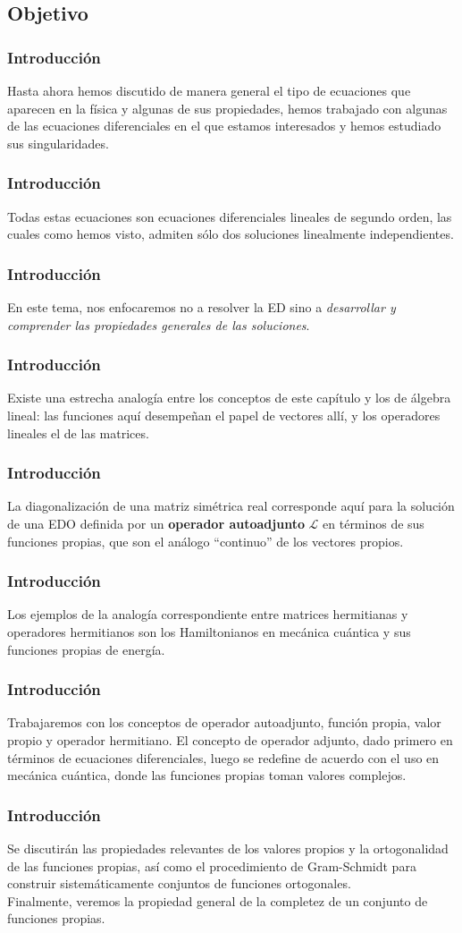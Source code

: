 \subsection{Objetivo}
\begin{frame}
\frametitle{Introducción}
Hasta ahora hemos discutido de manera general el tipo de ecuaciones que aparecen en la física y algunas de sus propiedades, hemos trabajado con algunas de las ecuaciones diferenciales en el que estamos interesados y hemos estudiado sus singularidades.
\end{frame}
\begin{frame}
\frametitle{Introducción}
Todas estas ecuaciones son ecuaciones diferenciales lineales de segundo orden, las cuales como hemos visto, admiten sólo dos soluciones linealmente independientes.
\end{frame}
\begin{frame}
\frametitle{Introducción}
En este tema, nos enfocaremos no a resolver la ED sino a \emph{desarrollar y comprender las propiedades generales de las soluciones}.
\end{frame}
\begin{frame}
\frametitle{Introducción}
Existe una estrecha analogía entre los conceptos de este capítulo y los de álgebra lineal: las funciones aquí desempeñan el papel de vectores allí, y los operadores lineales el de las matrices.
\end{frame}
\begin{frame}
\frametitle{Introducción}
La diagonalización de una matriz simétrica real corresponde aquí para la solución de una EDO definida por un \textbf{operador autoadjunto} $\mathcal{L}$ en términos de sus funciones propias, que son el análogo \enquote{continuo} de los vectores propios.
\end{frame}
\begin{frame}
\frametitle{Introducción}
Los ejemplos de la analogía correspondiente entre matrices hermitianas y operadores hermitianos son los Hamiltonianos en mecánica cuántica y sus funciones propias de energía.
\end{frame}
\begin{frame}
\frametitle{Introducción}
Trabajaremos con los conceptos de operador autoadjunto, función propia, valor propio y operador hermitiano. El concepto de operador adjunto, dado primero en términos de ecuaciones diferenciales, luego se redefine de acuerdo con el uso en mecánica cuántica, donde las funciones propias toman valores complejos.
\end{frame}
\begin{frame}
\frametitle{Introducción}
Se discutirán las propiedades relevantes de los valores propios y la ortogonalidad de las funciones propias, así como el procedimiento de Gram-Schmidt para construir sistemáticamente conjuntos de funciones ortogonales.
\\
\bigskip
\pause
Finalmente, veremos la propiedad general de la completez de un conjunto de funciones propias.
\end{frame}
